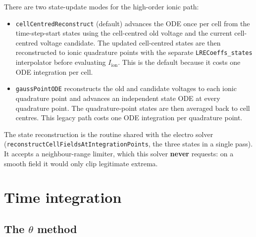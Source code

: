 \documentclass[11pt,a4paper]{article}
\newcommand{\code}[1]{\texttt{\small #1}}
\newcommand{\Iion}{I_{\mathrm{ion}}}
\begin{document}
There are two state-update modes for the high-order ionic path:
\begin{itemize}
\item \code{cellCentredReconstruct} (default) advances the ODE once per cell
from the time-step-start states using the cell-centred old voltage and the
current cell-centred voltage candidate. The updated cell-centred states are
then reconstructed to ionic quadrature points with the separate
\code{LRECoeffs\_states} interpolator before evaluating $\Iion$. This is the
default because it costs one ODE integration per cell.
\item \code{gaussPointODE} reconstructs the old and candidate voltages to each
ionic quadrature point and advances an independent state ODE at every
quadrature point. The quadrature-point states are then averaged back to cell
centres. This legacy path costs one ODE integration per quadrature point.
\end{itemize}

The state reconstruction is the routine shared with the electro solver
(\code{reconstructCellFieldsAtIntegrationPoints}, the three states in a single
pass). It accepts a neighbour-range limiter, which this solver \textbf{never}
requests: on a smooth field it would only clip legitimate extrema.

\section{Time integration}

\subsection{The \texorpdfstring{$\theta$}{theta} method}
\end{document}

